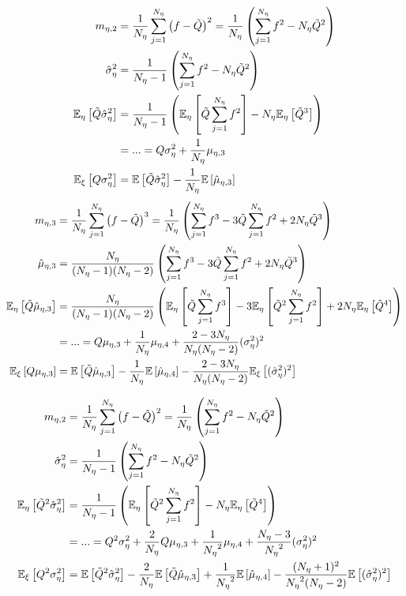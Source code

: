 \begin{equation}
    \begin{split}
        m_{\eta,2} &= \frac{1}{{N_\eta}}\sum_{j=1}^{N_\eta} \left(f-\tilde{Q}\right)^2 = \frac{1}{{N_\eta}}\left(\sum_{j=1}^{N_\eta} f^2 - {N_\eta}\tilde{Q}^2\right) \\
        \hat{\sigma}^2_\eta &= \frac{1}{{N_\eta}-1}\left(\sum_{j=1}^{N_\eta} f^2 - {N_\eta}\tilde{Q}^2\right) \\
        \mathbb{E}_\eta\left[\tilde{Q}\hat{\sigma}^2_\eta\right] &= \frac{1}{{N_\eta}-1}\left( \mathbb{E}_\eta\left[\tilde{Q}\sum_{j=1}^{N_\eta} f^2\right] - {N_\eta}\mathbb{E}_\eta\left[\tilde{Q}^3\right]\right) \\
        &= ... = Q\sigma^2_\eta + \frac{1}{{N_\eta}}\mu_{\eta,3} \\
        \mathbb{E}_\xi\left[Q\sigma^2_\eta\right] &= \mathbb{E}\left[\tilde{Q} \hat{\sigma}^2_\eta\right] - \frac{1}{{N_\eta}}\mathbb{E}\left[\hat{\mu}_{\eta,3}\right]
    \end{split}
\end{equation}
\begin{equation}
    \begin{split}
        m_{\eta,3} &= \frac{1}{{N_\eta}}\sum_{j=1}^{N_\eta} \left(f-\tilde{Q}\right)^3 = \frac{1}{{N_\eta}}\left(\sum_{j=1}^{N_\eta} f^3 - 3\tilde{Q}\sum_{j=1}^{N_\eta} f^2 + 2{N_\eta}\tilde{Q}^3 \right) \\
        \hat{\mu}_{\eta,3} &= \frac{{N_\eta}}{({N_\eta}-1)({N_\eta}-2)}\left(\sum_{j=1}^{N_\eta} f^3 - 3\tilde{Q}\sum_{j=1}^{N_\eta} f^2 + 2{N_\eta}\tilde{Q}^3 \right) \\
        \mathbb{E}_\eta\left[\tilde{Q}\hat{\mu}_{\eta,3}\right] &= \frac{{N_\eta}}{({N_\eta}-1)({N_\eta}-2)} \left( \mathbb{E}_\eta\left[\tilde{Q}\sum_{j=1}^{N_\eta} f^3\right] - 3\mathbb{E}_\eta\left[\tilde{Q}^2\sum_{j=1}^{N_\eta} f^2\right] + 2{N_\eta}\mathbb{E}_\eta\left[\tilde{Q}^4\right]\right) \\
        &= ... = Q\mu_{\eta,3} + \frac{1}{{N_\eta}}\mu_{\eta,4} + \frac{2-3{N_\eta}}{{N_\eta}({N_\eta}-2)}(\sigma^2_\eta)^2\\
        \mathbb{E}_\xi\left[Q\mu_{\eta,3}\right] &= \mathbb{E}\left[\tilde{Q} \hat{\mu}_{\eta,3}\right] - \frac{1}{{N_\eta}}\mathbb{E}\left[\hat{\mu}_{\eta,4}\right] - \frac{2-3{N_\eta}}{{N_\eta}({N_\eta}-2)}\mathbb{E}_\xi\left[(\hat{\sigma}^2_\eta)^2\right]
    \end{split}
\end{equation}


\begin{equation}
    \begin{split}
        m_{\eta,2} &= \frac{1}{{N_\eta}}\sum_{j=1}^{N_\eta} \left(f-\tilde{Q}\right)^2 = \frac{1}{{N_\eta}}\left(\sum_{j=1}^{N_\eta} f^2 - {N_\eta}\tilde{Q}^2\right) \\
        \hat{\sigma}^2_\eta &= \frac{1}{{N_\eta}-1}\left(\sum_{j=1}^{N_\eta} f^2 - {N_\eta}\tilde{Q}^2\right) \\
        \mathbb{E}_\eta\left[\tilde{Q}^2\hat{\sigma}^2_\eta\right] &= \frac{1}{{N_\eta}-1}\left( \mathbb{E}_\eta\left[\tilde{Q}^2\sum_{j=1}^{N_\eta} f^2\right] - {N_\eta}\mathbb{E}_\eta\left[\tilde{Q}^4\right]\right) \\
        &= ... = Q^2\sigma^2_\eta + \frac{2}{{N_\eta}}Q\mu_{\eta,3} + \frac{1}{{N_\eta}^2}\mu_{\eta,4} + \frac{{N_\eta}-3}{{N_\eta}^2}(\sigma^2_\eta)^2\\
        \mathbb{E}_\xi\left[Q^2\sigma^2_\eta\right] &= \mathbb{E}\left[\tilde{Q}^2 \hat{\sigma}^2_\eta\right] - \frac{2}{{N_\eta}}\mathbb{E}\left[\tilde{Q} \hat{\mu}_{\eta,3}\right] + \frac{1}{{N_\eta}^2}\mathbb{E}\left[\hat{\mu}_{\eta,4}\right] - \frac{({N_\eta}+1)^2}{{N_\eta}^2({N_\eta}-2)}\mathbb{E}\left[(\hat{\sigma}^2_\eta)^2\right]
    \end{split}
\end{equation}


